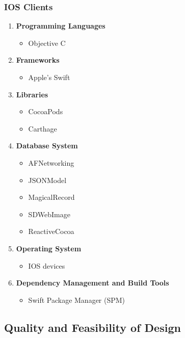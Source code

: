 \documentclass{article}
\begin{document}
		\subsubsection{IOS Clients}
		\begin{enumerate}
		 \item \textbf{Programming Languages}
			\begin{itemize}
				\item Objective C
			\end{itemize}
		\item \textbf{Frameworks}
			\begin{itemize}
				\item Apple's Swift
			\end{itemize}
		\item \textbf{Libraries}
			\begin{itemize}
				\item CocoaPods
				\item Carthage
			\end{itemize}
		\item \textbf{Database System}
			\begin{itemize}
 				\item AFNetworking
				\item JSONModel
				\item MagicalRecord
				\item SDWebImage
				\item ReactiveCocoa
			\end{itemize}
		\item \textbf{Operating System}
			\begin{itemize}
 				\item IOS devices
			\end{itemize}
		\item \textbf{Dependency Management and Build Tools}
			\begin{itemize}
				\item Swift Package Manager (SPM)
			\end{itemize}
		\end{enumerate}
		\subsection{Quality and Feasibility of Design}
	
\end{document}
